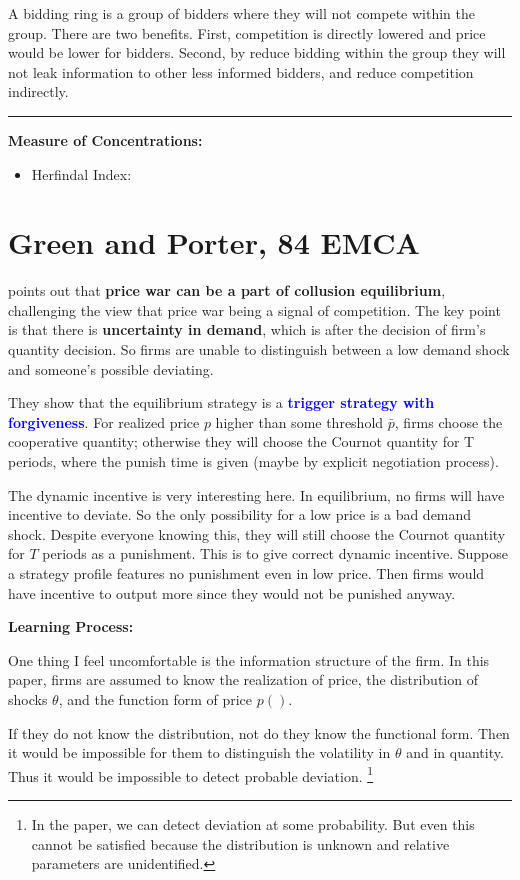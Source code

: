 \documentclass{book}
\theoremstyle{plain}
\theoremstyle{definition}
\newcommand{\myline}{\vspace{3mm} \hrule \vspace{4mm}}
\begin{document}
A bidding ring is a group of bidders where they will not compete within the group. 
There are two benefits.
First, competition is directly lowered and price would be lower for bidders.
Second, by reduce bidding within the group they will not leak information to other less informed bidders, and reduce competition indirectly.

\myline

\noindent
\textbf{Measure of Concentrations:}
\begin{itemize}
	\item Herfindal Index: 
\end{itemize}


\section{Green and Porter, 84 EMCA} %
\label{sec:green_and_porter_84_emca}

\textbf{}

\cite{Green_Porter:1984EMCA} points out that \textbf{price war can be a part of collusion equilibrium}, challenging the view that price war being a signal of competition.
The key point is that there is \textbf{uncertainty in demand}, which is after the decision of firm's quantity decision.
So firms are unable to distinguish between a low demand shock and someone's possible deviating.

They show that the equilibrium strategy is a \textbf{\textcolor{blue}{trigger strategy with forgiveness}}.
For realized price $p$ higher than some threshold $\bar p$,
firms choose the cooperative quantity;
otherwise they will choose the Cournot quantity for T periods, where the punish time is given (maybe by explicit negotiation process).

The dynamic incentive is very interesting here.
In equilibrium, no firms will have incentive to deviate. 
So the only possibility for a low price is a bad demand shock.
Despite everyone knowing this, they will still choose the Cournot quantity for $T$ periods as a punishment.
This is to give correct dynamic incentive.
Suppose a strategy profile features no punishment even in low price.
Then firms would have incentive to output more since they would not be punished anyway.

\begin{mdframed}[style=comment]
\noindent
\textbf{Learning Process:}

One thing I feel uncomfortable is the information structure of the firm. 
In this paper, firms are assumed to know the realization of price, the distribution of shocks $\theta$, and the function form of price $p()$.

If they do not know the distribution, not do they know the functional form.
Then it would be impossible for them to distinguish the volatility in $\theta$ and in quantity.
Thus it would be impossible to detect probable deviation.
\footnote{In the paper, we can detect deviation at some probability. But even this cannot be satisfied because the distribution is unknown and relative parameters are unidentified.}
\end{mdframed}
\end{document}
